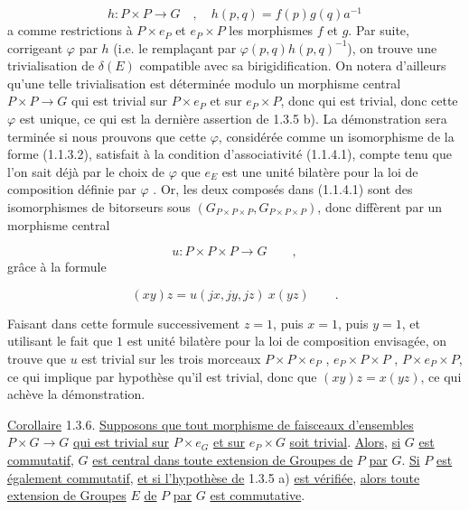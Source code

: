 \begin{equation*}
h : P \times P \longrightarrow G \quad , \quad h(p,q) = f(p)g(q)a^{-1}
\end{equation*}
a comme restrictions à $P \times e_P$ et $e_P \times P$ les morphismes $f$ et $g$. Par suite, corrigeant $\varphi$ par $h$ (i.e. le remplaçant par $\varphi(p,q)h(p,q)^{-1}$), on trouve une trivialisation de $\delta(E)$ compatible avec sa birigidification. On notera d'ailleurs qu'une telle trivialisation est déterminée modulo un morphisme central $P \times P \longrightarrow G$ qui est trivial sur $P \times e_P$ et sur $e_P \times P$, donc qui est trivial, donc cette $\varphi$ est unique, ce qui est la dernière assertion de 1.3.5 b). La démonstration sera terminée si nous prouvons que cette $\varphi$, considérée comme un isomorphisme de la forme (1.1.3.2), satisfait à la condition d'associativité (1.1.4.1), compte tenu que l'on sait déjà par le choix de $\varphi$ que $e_E$ est une unité bilatère pour la loi de composition définie par $\varphi$ . Or, les deux composés dans (1.1.4.1) sont des isomorphismes de bitorseurs sous $(G_{P \times P \times P} , G_{P \times P \times P})$, donc diffèrent par un morphisme central

\begin{equation*}
u : P \times P \times P \longrightarrow G \qquad ,
\end{equation*}
grâce à la formule

\begin{equation*}
(xy)z = u(jx,jy,jz) \ x(yz) \qquad .
\end{equation*}


Faisant dans cette formule successivement $z=1$, puis $x=1$, puis $y=1$, et utilisant le fait que $1$ est unité bilatère pour la loi de composition envisagée, on trouve que $u$ est trivial sur les trois morceaux $P\times P\times e_P$ , $e_P\times P\times P$ , $P\times e_P\times P$, ce qui implique par hypothèse qu'il est trivial, donc que $(xy)z = x(yz)$, ce qui achève la démonstration.

\underline{Corollaire} 1.3.6. \underline{Supposons que tout morphisme de faisceaux d'ensembles} $P\times G \longrightarrow G$ \underline{qui est trivial sur} $P\times e_G$ \underline{et sur} $e_P\times G$ \underline{soit trivial}. \underline{Alors}, \underline{si} $G$ \underline{est commutatif}, $G$ \underline{est central dans toute extension de Groupes de} $P$ \underline{par} $G$. \underline{Si} $P$ \underline{est également commutatif}, \underline{et si l'hypothèse de} 1.3.5 a) \underline{est vérifiée}, \underline{alors toute extension de Groupes} $E$ \underline{de} $P$ \underline{par} $G$ \underline{est commutative}.

